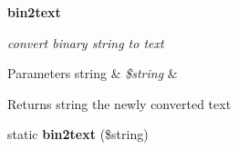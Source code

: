 \begin{Indent}{\bf bin2text}\par
{\em convert binary string to text


\begin{DoxyParams}[1]{Parameters}
string & {\em \$string} & \\
\hline
\end{DoxyParams}
\begin{DoxyReturn}{Returns}
string the newly converted text 
\end{DoxyReturn}
}\begin{DoxyCompactItemize}
\item 
\hypertarget{class_strings_acfe2a9264b2467a3f8f38a21247998a3}{static {\bfseries bin2text} (\$string)}\label{class_strings_acfe2a9264b2467a3f8f38a21247998a3}


\end{DoxyCompactItemize}
\end{Indent}
